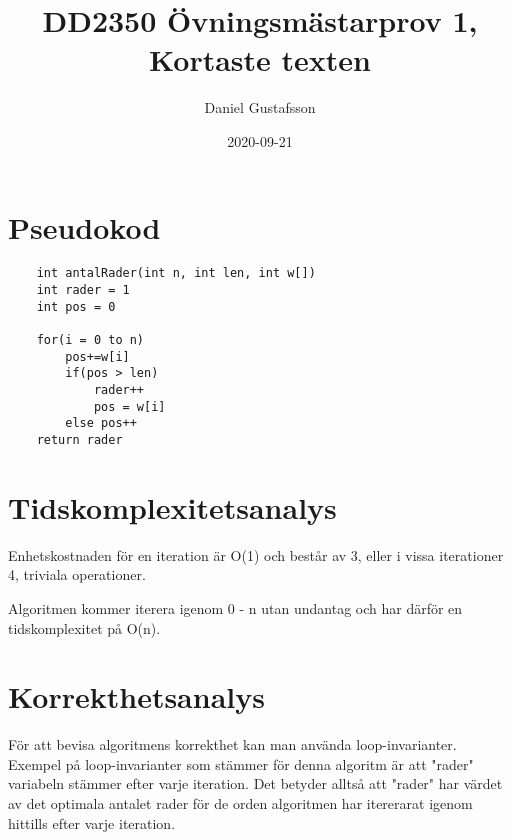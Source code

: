 \documentclass[11pt]{article}
\title{DD2350 Övningsmästarprov 1, Kortaste texten}
\date{2020-09-21}
\author{Daniel Gustafsson}
\begin{document}
\maketitle
\newpage

\section{Pseudokod}
\begin{lstlisting}
    int antalRader(int n, int len, int w[])
    int rader = 1
    int pos = 0

    for(i = 0 to n)
        pos+=w[i]
        if(pos > len)
            rader++
            pos = w[i]
        else pos++
    return rader
\end{lstlisting}
\section{Tidskomplexitetsanalys}
Enhetskostnaden för en iteration är O(1) och består av 3,
eller i vissa iterationer 4, triviala operationer.

Algoritmen kommer iterera igenom 0 - n utan undantag och 
har därför en tidskomplexitet på O(n).
\section{Korrekthetsanalys}
För att bevisa algoritmens korrekthet kan man använda
loop-invarianter. Exempel på loop-invarianter som stämmer
för denna algoritm är att "rader" variabeln stämmer
efter varje iteration. Det betyder alltså att "rader" har
värdet av det optimala antalet rader för de orden 
algoritmen har itererarat igenom hittills efter varje 
iteration.
\end{document}

